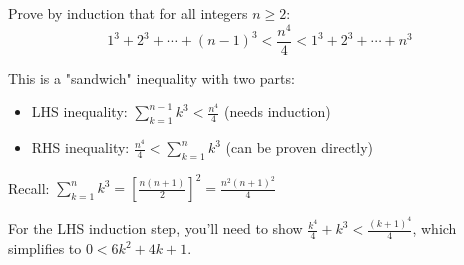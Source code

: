 
\begin{problem}
Prove by induction that for all integers $n \geq 2$:
\[
1^3 + 2^3 + \cdots + (n-1)^3 < \frac{n^4}{4} < 1^3 + 2^3 + \cdots + n^3
\]
\end{problem}

\begin{hint}
This is a "sandwich" inequality with two parts:
\begin{itemize}
\item LHS inequality: $\sum_{k=1}^{n-1} k^3 < \frac{n^4}{4}$ (needs induction)
\item RHS inequality: $\frac{n^4}{4} < \sum_{k=1}^{n} k^3$ (can be proven directly)
\end{itemize}

Recall: $\sum_{k=1}^{n} k^3 = \left[\frac{n(n+1)}{2}\right]^2 = \frac{n^2(n+1)^2}{4}$

For the LHS induction step, you'll need to show $\frac{k^4}{4} + k^3 < \frac{(k+1)^4}{4}$, which simplifies to $0 < 6k^2 + 4k + 1$.
\end{hint}

